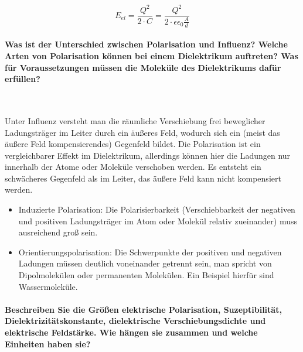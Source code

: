 \documentclass[a4paper, 11pt, parskip=half]{scrartcl}
\begin{document}
\begin{equation}
    E_{el} = \frac{Q^2}{2 \cdot C} = \frac{Q^2}{2 \cdot \epsilon \epsilon_0 \frac{A}{d}}
\end{equation}

\paragraph{Was ist der Unterschied zwischen Polarisation und Influenz? Welche Arten von Polarisation
können bei einem Dielektrikum auftreten? Was für Voraussetzungen müssen die Moleküle des
Dielektrikums dafür erfüllen?} ~

Unter Influenz versteht man die räumliche Verschiebung frei beweglicher Ladungsträger im Leiter
durch ein äußeres Feld, wodurch sich ein (meist das äußere Feld kompensierendes) Gegenfeld bildet.
Die Polarisation ist ein vergleichbarer Effekt im Dielektrikum, allerdings können hier die Ladungen
nur innerhalb der Atome oder Moleküle verschoben werden. Es entsteht ein schwächeres Gegenfeld als
im Leiter, das äußere Feld kann nicht kompensiert werden.

\begin{itemize}
    \item Induzierte Polarisation: Die Polarisierbarkeit (Verschiebbarkeit der negativen und
    positiven Ladungsträger im Atom oder Molekül relativ zueinander) muss ausreichend groß sein.
    
    \item Orientierungspolarisation: Die Schwerpunkte der positiven und negativen Ladungen müssen
    deutlich voneinander getrennt sein, man spricht von Dipolmolekülen oder permanenten Molekülen.
    Ein Beispiel hierfür sind Wassermoleküle.
\end{itemize}

\paragraph{Beschreiben Sie die Größen elektrische Polarisation, Suzeptibilität,
Dielektrizitätskonstante, dielektrische Verschiebungsdichte und elektrische Feldstärke. Wie hängen
sie zusammen und welche Einheiten haben sie?}
\end{document}
